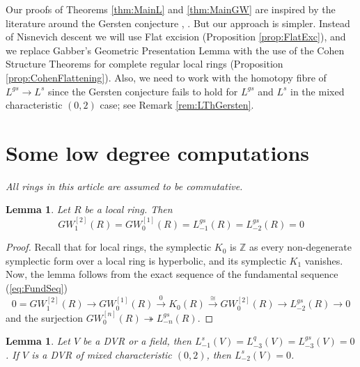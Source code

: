 \documentclass[10pt,twoside,a4paper,reqno]{amsart}
\newtheorem{lemma}[theorem]{Lemma}
\theoremstyle{definition}
\numberwithin{equation}{section}
\newcommand{\Z}{\mathbb{Z}}
\renewcommand{\|}{\operatorname{|}}
\begin{document}
Our proofs of Theorems \ref{thm:MainL} and \ref{thm:MainGW} are inspired by the literature around the Gersten conjecture \cite{CHK}, \cite{SchmidtStrunk}.
But our approach is simpler.
Instead of Nisnevich descent we will use Flat excision (Proposition \ref{prop:FlatExc}), and we replace Gabber's Geometric Presentation Lemma with the use of the Cohen Structure Theorems for complete regular local rings (Proposition \ref{prop:CohenFlattening}).
Also, we need to work with the homotopy fibre of $L^{gs} \to L^s$ since the Gersten conjecture fails to hold for $L^{gs}$ and $L^s$ in the mixed characteristic $(0,2)$ case; see Remark 
\ref{rem:LThGersten}. 



\section{Some low degree computations}

\vspace{2ex}
{\em All rings in this article are assumed to be commutative.}

\begin{lemma}
\label{lem:Lgs-1}
Let $R$ be a local ring. Then $$GW^{[2]}_1(R)=GW^{[1]}_0(R)=L^{gs}_{-1}(R)=L^{gs}_{-2}(R)=0$$
\end{lemma}

\begin{proof}
Recall that for local rings, the symplectic $K_0$ is $\Z$ as every non-degenerate symplectic form over a local ring is hyperbolic, and its symplectic $K_1$ vanishes.
Now, the lemma follows from the exact sequence of the fundamental sequence (\ref{eq:FundSeq})
$$0=GW_1^{[2]}(R) \longrightarrow GW^{[1]}_0(R)  \stackrel{0}{\longrightarrow} K_0(R)  \stackrel{\cong}{\longrightarrow} GW_0^{[2]} (R) \longrightarrow L^{gs}_{-2}(R)  \to 0$$
and the surjection $GW^{[n]}_0(R)  \twoheadrightarrow  L^{gs}_{-n}(R) $. 
\end{proof}


\begin{lemma}
\label{lem:L-1DVR}
Let $V$ be a DVR or a field, then $L^s_{-1}(V)=L^q_{-3}(V)=L^{gs}_{-3}(V)=0$.
If $V$ is a DVR of mixed characteristic $(0,2)$, then $L^s_{-2}(V)=0$.
\end{lemma}
\end{document}
